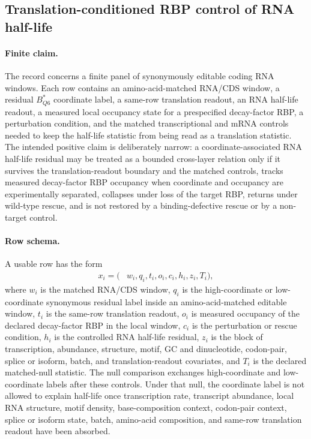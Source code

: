 \subsection{Translation-conditioned RBP control of RNA half-life}\label{sec:q6-translation-conditioned-rbp-rna-half-life-cross-layer}

\paragraph{Finite claim.}
The record concerns a finite panel of synonymously editable coding RNA windows.  Each row contains an amino-acid-matched RNA/CDS window, a residual $B^{\ast}_{Q6}$ coordinate label, a same-row translation readout, an RNA half-life readout, a measured local occupancy state for a prespecified decay-factor RBP, a perturbation condition, and the matched transcriptional and mRNA controls needed to keep the half-life statistic from being read as a translation statistic.  The intended positive claim is deliberately narrow: a coordinate-associated RNA half-life residual may be treated as a bounded cross-layer relation only if it survives the translation-readout boundary and the matched controls, tracks measured decay-factor RBP occupancy when coordinate and occupancy are experimentally separated, collapses under loss of the target RBP, returns under wild-type rescue, and is not restored by a binding-defective rescue or by a non-target control.

\paragraph{Row schema.}
A usable row has the form
$$
\begin{aligned}
  x_i = (&w_i, q_i, t_i, o_i, c_i, h_i, z_i, T_i),
\end{aligned}
$$
where $w_i$ is the matched RNA/CDS window, $q_i$ is the high-coordinate or low-coordinate synonymous residual label inside an amino-acid-matched editable window, $t_i$ is the same-row translation readout, $o_i$ is measured occupancy of the declared decay-factor RBP in the local window, $c_i$ is the perturbation or rescue condition, $h_i$ is the controlled RNA half-life residual, $z_i$ is the block of transcription, abundance, structure, motif, GC and dinucleotide, codon-pair, splice or isoform, batch, and translation-readout covariates, and $T_i$ is the declared matched-null statistic.  The null comparison exchanges high-coordinate and low-coordinate labels after these controls.  Under that null, the coordinate label is not allowed to explain half-life once transcription rate, transcript abundance, local RNA structure, motif density, base-composition context, codon-pair context, splice or isoform state, batch, amino-acid composition, and same-row translation readout have been absorbed.

